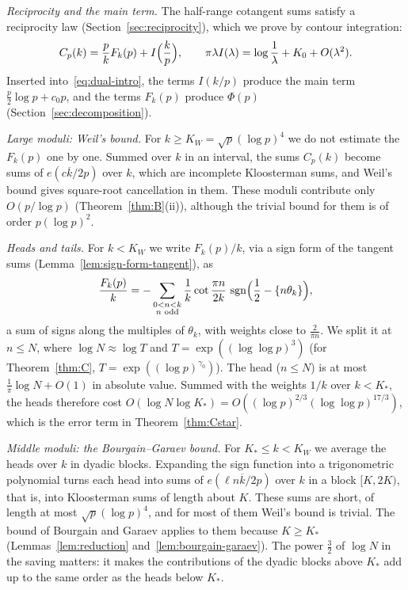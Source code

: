 \emph{Reciprocity and the main term.} The half-range cotangent sums satisfy a reciprocity law (Section~\ref{sec:reciprocity}), which we prove by contour integration:
\[
C_p(k)=\frac pkF_k(p)+I\Bigl(\frac kp\Bigr),\qquad\pi\lambda I(\lambda)=\log\frac1\lambda+K_0+O(\lambda^2).
\]
Inserted into~\eqref{eq:dual-intro}, the terms $I(k/p)$ produce the main term $\frac p2\log p+c_0p$, and the terms $F_k(p)$ produce $\Phi(p)$ (Section~\ref{sec:decomposition}).

\emph{Large moduli: Weil's bound.} For $k\ge K_W=\sqrt p(\log p)^4$ we do not estimate the $F_k(p)$ one by one. Summed over $k$ in an interval, the sums $C_p(k)$ become sums of $e(c\overline k/2p)$ over $k$, which are incomplete Kloosterman sums, and Weil's bound gives square-root cancellation in them. These moduli contribute only $O(p/\log p)$ (Theorem~\ref{thm:B}(ii)), although the trivial bound for them is of order $p(\log p)^2$.

\emph{Heads and tails.} For $k<K_W$ we write $F_k(p)/k$, via a sign form of the tangent sums (Lemma~\ref{lem:sign-form-tangent}), as
\[
\frac{F_k(p)}k=-\sum_{\substack{0<n<k\\ n\text{ odd}}}\frac1k\cot\frac{\pi n}{2k}\,\operatorname{sgn}\Bigl(\frac12-\{n\theta_k\}\Bigr),
\]
a sum of signs along the multiples of $\theta_k$, with weights close to $\frac2{\pi n}$. We split it at $n\le N$, where $\log N\approx\log T$ and $T=\exp((\log\log p)^3)$ (for Theorem~\ref{thm:C}, $T=\exp((\log p)^{\gamma_0})$). The head ($n\le N$) is at most $\frac1\pi\log N+O(1)$ in absolute value. Summed with the weights $1/k$ over $k<K_*$, the heads therefore cost $O(\log N\log K_*)=O((\log p)^{2/3}(\log\log p)^{17/3})$, which is the error term in Theorem~\ref{thm:Cstar}.

\emph{Middle moduli: the Bourgain--Garaev bound.} For $K_*\le k<K_W$ we average the heads over $k$ in dyadic blocks. Expanding the sign function into a trigonometric polynomial turns each head into sums of $e(\ell n\overline k/2p)$ over $k$ in a block $[K,2K)$, that is, into Kloosterman sums of length about $K$. These sums are short, of length at most $\sqrt p(\log p)^4$, and for most of them Weil's bound is trivial. The bound of Bourgain and Garaev applies to them because $K\ge K_*$ (Lemmas~\ref{lem:reduction} and~\ref{lem:bourgain-garaev}). The power $\frac32$ of $\log N$ in the saving matters: it makes the contributions of the dyadic blocks above $K_*$ add up to the same order as the heads below $K_*$.

